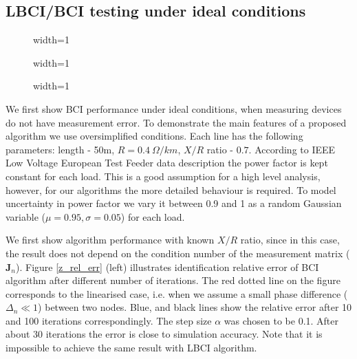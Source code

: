 \documentclass[journal,10pt,onecolumn,draftclsnofoot,]{IEEEtran}
\theoremstyle{plain}
\theoremstyle{definition}
\theoremstyle{remark}
\begin{document}
\subsection{LBCI/BCI testing under ideal conditions}
\begin{figure*}[t]
\begin{subfigure}{0.33\linewidth}
\centering
\begin{adjustbox}{width=1\columnwidth}

\end{adjustbox}
\end{subfigure}
\begin{subfigure}{0.33\linewidth}
\centering
\begin{adjustbox}{width=1\columnwidth}

\end{adjustbox}
\end{subfigure}
\begin{subfigure}{0.33\linewidth}
\centering
\begin{adjustbox}{width=1\columnwidth}

\end{adjustbox}
\end{subfigure}
\caption{Impedance identification error for each power line. FBCI and BCI algorithms under ideal conditions (left, center). Condition number for matrix $\bm{J}_n$(right).}
\label{z_rel_err}
\end{figure*}
We first show BCI performance under ideal conditions, when measuring devices do not have measurement error. To demonstrate the main features of a proposed algorithm we use oversimplified conditions. Each line has the following parameters: length - 50m, $R = 0.4 ~\Omega/km$, $X/R$ ratio - $0.7$. According to IEEE Low Voltage European Test Feeder data description the power factor is kept constant for each load. This is a good assumption for a high level analysis, however, for our algorithms the more detailed behaviour is required. To model uncertainty in power factor we vary it between 0.9 and 1 as a random Gaussian variable ($\mu = 0.95, \sigma = 0.05$) for each load.

We first show algorithm performance with known $X/R$ ratio, since in this case, the result does not depend on the condition number of the measurement matrix ($\bm{J}_n$). Figure \ref{z_rel_err} (left) illustrates identification relative error of BCI algorithm after different number of iterations. The red dotted line on the figure corresponds to the linearised case, i.e. when we assume a small phase difference ($\Delta_n \ll 1$) between two nodes. Blue, and black lines show the relative error after 10 and 100 iterations correspondingly. The step size $\alpha$ was chosen to be 0.1. After about 30 iterations the error is close to simulation accuracy. Note that it is impossible to achieve the same result with LBCI algorithm.
\end{document}
